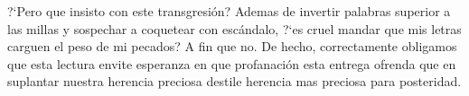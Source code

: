 \documentclass[12pt]{article}
\begin{document}
\begin{multicols*}{2}
		\mbox{?`}Pero que insisto con este transgresi\'{o}n? Ademas de invertir palabras superior a las millas y sospechar a coquetear con esc\'{a}ndalo, \mbox{?`}es cruel mandar que mis letras carguen el peso de mi pecados? A fin que no. De hecho, correctamente obligamos que esta lectura envite esperanza en que profanación esta entrega ofrenda que en suplantar nuestra herencia preciosa destile herencia mas preciosa para posteridad.  
	\end{multicols*}
	
	
	
\end{document}
